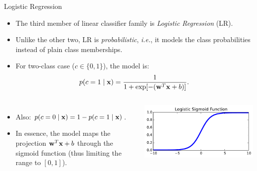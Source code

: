 \documentclass[10pt, aspectratio=169]{beamer} %
\newcommand{\w}{{\bf w}}
\newcommand{\x}{{\bf x}}
\begin{document}
\begin{frame}{Logistic Regression}
\begin{itemize}
\item The third member of linear classifier family is \textit{Logistic Regression} (LR).
\item Unlike the other two, LR is \textit{probabilistic}, \textit{i.e.}, it models the 
class probabilities instead of plain class memberships.
\item For two-class case ($c\in\{0,1\}$), the model is:
\[
p(c=1 \mid \x) = \frac{1}{1 + \exp[-(\w^T\x + b)]}.
\]
\end{itemize}
\begin{columns}[onlytextwidth]
\begin{itemize}
\item Also: $p(c=0\mid\x) =  1-p(c=1\mid\x)$.
	\item In essence, the model maps the projection $\w^T\x + b$
	through the sigmoid function (thus limiting the range to $[0,1]$).
\end{itemize}
\centerline{\includegraphics[width=\textwidth]{sigmoid.pdf}}
\end{columns}
\end{frame}
\end{document}
